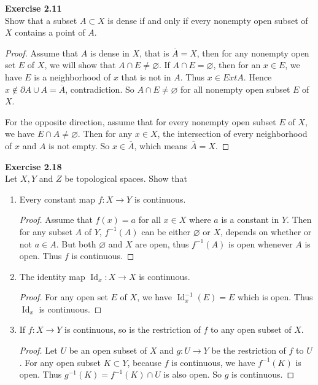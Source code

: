 \documentclass[12pt, a4paper]{article}
\theoremstyle{plain}
\DeclareMathOperator{\Id}{Id}
\newenvironment{exercise}[2][Exercise]
    { \begin{mdframed}[backgroundcolor=gray!20] \textbf{#1 #2} \\}
    {  \end{mdframed}}
\begin{document}
\begin{exercise}{2.11}
Show that a subset $A\subset X$ is dense if and only if every nonempty open subset of $X$ contains a point of $A$.
\end{exercise}
	\begin{proof}
	Assume that $A$ is dense in $X$, that is $\overline{A}=X$, then for any nonempty open set $E$ of $X$, we will show that $A\cap E\neq \varnothing$. If $A\cap E=\varnothing$, then for an $x\in E$, we have $E$ is a neighborhood of $x$ that is not in $A$. Thus $x\in Ext A$. Hence $x\notin \partial A\cup A=\overline{A}$, contradiction. So $A\cap E\neq\varnothing$ for all nonempty open subset $E$ of $X$.
	
	For the opposite direction, assume that for every nonempty open subset $E$ of $X$, we have $E\cap A\neq \varnothing$. Then for any $x\in X$, the intersection of every neighborhood of $x$ and $A$ is not empty. So $x\in \overline{A}$, which means $\overline{A}=X$.
	\end{proof}

\begin{exercise}{2.18}
Let $X,Y$ and $Z$ be topological spaces. Show that
\begin{enumerate}[label=(\alph*)]
\item Every constant map $f:X\rightarrow Y$ is continuous.
	\begin{proof}
	Assume that $f(x)=a$ for all $x\in X$ where $a$ is a constant in $Y$. Then for any subset $A$ of $Y$, $f^{-1}(A)$ can be either $\varnothing$ or $X$, depends on whether or not $a\in A$. But both $\varnothing$ and $X$ are open, thus $f^{-1}(A)$ is open whenever $A$ is open. Thus $f$ is continuous.
	\end{proof}
\item The identity map $\Id_x:X\rightarrow X$ is continuous.
	\begin{proof}
	For any open set $E$ of $X$, we have $\Id_x^{-1}(E)=E$ which is open. Thus $\Id_x$ is continuous.
	\end{proof}
\item If $f:X\rightarrow Y$ is continuous, so is the restriction of $f$ to any open subset of $X$.
	\begin{proof}
	Let $U$ be an open subset of $X$ and $g:U\rightarrow Y$ be the restriction of $f$ to $U$. For any open subset $K\subset Y$, because $f$ is continuous, we have $f^{-1}(K)$ is open. Thus $g^{-1}(K)=f^{-1}(K)\cap U$ is also open. So $g$ is continuous.
	\end{proof}
\end{enumerate}
\end{exercise}
\end{document}
